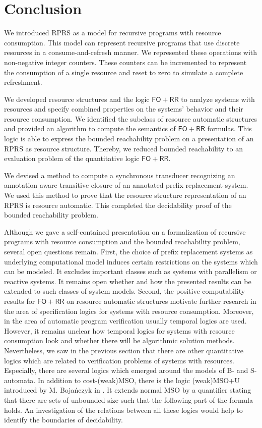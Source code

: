 \documentclass{LMCS}
\newcommand{\FORR}{\ensuremath{\mathsf{FO\!\!+\!\!RR}}}
\newcommand{\RPRS}{\textsf{RPRS}}
\begin{document}
\section{Conclusion}
\label{sec:Conclusion}

We introduced \RPRS{} as a model for recursive programs with resource
consumption. This model can represent recursive programs that use discrete
resources in a consume-and-refresh manner. We represented these operations with
non-negative integer counters. These counters can be incremented to represent
the consumption of a single resource and reset to zero to simulate a complete
refreshment. 

We developed resource structures and the logic \FORR{} to analyze systems with
resources and specify combined properties on the systems' behavior and their
resource consumption. We identified the subclass of resource automatic
structures and provided an algorithm to compute the semantics of \FORR{}
formulas. This logic is able to express the bounded reachability
problem on a presentation of an \RPRS{} as resource structure. Thereby, we
reduced bounded reachability to an evaluation problem of the quantitative logic
\FORR{}. 

We devised a method to compute a synchronous transducer recognizing an
annotation aware transitive closure of an annotated prefix replacement system.
We used this method to prove that the resource structure representation of an
\RPRS{} is resource automatic. This completed the decidability proof of the
bounded reachability problem. 

Although we gave a self-contained presentation on a formalization of recursive
programs with resource consumption and the bounded reachability problem,
several open questions remain. First, the choice of prefix replacement systems
as underlying computational model induces certain restrictions on the systems
which can be modeled. It excludes important classes such as systems with
parallelism or reactive systems. It remains open whether and how the presented
results can be extended to such classes of system models. Second, the positive
computability results for \FORR{} on resource automatic structures motivate
further research in the area of specification logics for systems with resource
consumption. Moreover, in the area of automatic program verification usually
temporal logics are used. However, it remains unclear how temporal logics for
systems with resource consumption look and whether there will be
algorithmic solution methods. Nevertheless, we saw in the previous section that
there are other quantitative logics which are related to verification problems
of systems with resources. Especially, there are several logics which emerged
around the models of B- and S-automata. In addition to cost-(weak)MSO, there is the
logic (weak)MSO+U introduced by M. Bojańczyk in \cite{wmsoPu}. It extends normal
MSO by a quantifier stating that there are sets of unbounded size such that the
following part of the formula holds. An investigation of the relations between
all these logics would help to identify the boundaries of decidability.

\nocite{regularcostfunctions}


\end{document}
